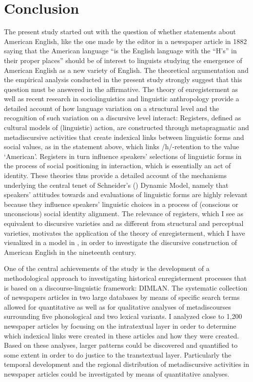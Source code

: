 \chapter{Conclusion}
\label{bkm:Ref13747659}\hypertarget{Toc63021256}{}
The present study started out with the question of whether statements about American English, like the one made by the editor in a newspaper article in 1882 saying that the American language “is the English language with the “H’s” in their proper places” should be of interest to linguists studying the emergence of American English as a new variety of English. The theoretical argumentation and the empirical analysis conducted in the present study strongly suggest that this question must be answered in the affirmative. The theory of enregisterment as well as recent research in sociolinguistics and linguistic anthropology provide a detailed account of how language variation on a structural level and the recognition of such variation on a discursive level interact: Registers, defined as cultural models of (linguistic) action, are constructed through metapragmatic and metadiscursive activities that create indexical links between linguistic forms and social values, as in the statement above, which links /h/-retention to the value ‘American’. Registers in turn influence speakers’ selections of linguistic forms in the process of social positioning in interaction, which is essentially an act of identity. These theories thus provide a detailed account of the mechanisms underlying the central tenet of Schneider’s (\citeyear{Schneider2003, Schneider2007}) Dynamic Model, namely that speakers’ attitudes towards and evaluations of linguistic forms are highly relevant because they influence speakers’ linguistic choices in a process of (conscious or unconscious) social identity alignment. The relevance of registers, which I see as equivalent to discursive varieties and as different from structural and perceptual varieties, motivates the application of the theory of enregisterment, which I have visualized in a model in , in order to investigate the discursive construction of American English in the nineteenth century.


One of the central achievements of the study is the development of a methodological approach to investigating historical enregisterment processes that is based on a discourse-linguistic framework: DIMLAN. The systematic collection of newspapers articles in two large databases by means of specific search terms allowed for quantitative as well as for qualitative analyses of metadiscourses surrounding five phonological and two lexical variants. I analyzed close to 1,200 newspaper articles by focusing on the intratextual layer in order to determine which indexical links were created in these articles and how they were created. Based on these analyses, larger patterns could be discovered and quantified to some extent in order to do justice to the transtextual layer. Particularly the temporal development and the regional distribution of metadiscursive activities in newspaper articles could be investigated by means of quantitative analyses.

